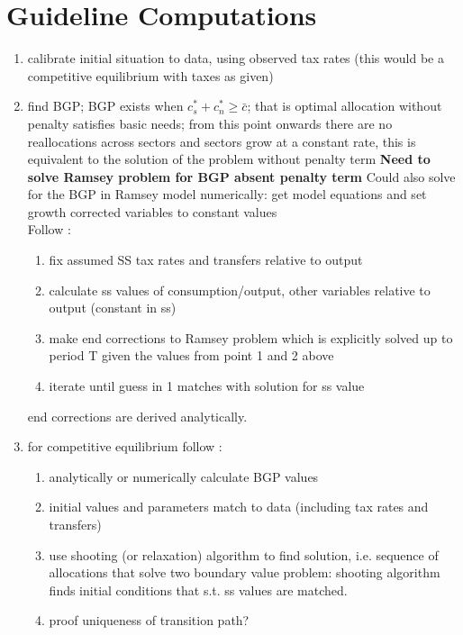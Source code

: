 \section{Guideline Computations}
\begin{enumerate}
	\item calibrate initial situation to data, using observed tax rates (this would be a competitive equilibrium with taxes as given)
	\item find BGP; BGP exists when $c^*_s+c_n^*\geq \bar{c}$; that is optimal allocation without penalty satisfies basic needs; from this point onwards there are no reallocations across sectors and sectors grow at a constant rate, this is equivalent to the solution of the problem without penalty term \ar \textbf{Need to solve Ramsey problem for BGP absent penalty term}
	Could also solve for the BGP in Ramsey model numerically: get model equations and set growth corrected variables to constant values\\
	Follow \cite{Jones1993OptimalGrowth}:
	\begin{enumerate}
		\item fix assumed SS tax rates and transfers relative to output
		\item calculate ss values of consumption/output, other variables relative to output (constant in ss)
		\item make end corrections to Ramsey problem which is explicitly solved up to period T given the values from point 1 and 2 above
		\item iterate until guess in 1 matches with solution for ss value 
	\end{enumerate}
end corrections are derived analytically.
	\item for competitive equilibrium follow \cite{Acemoglu2008CapitalGrowth}: 
	\begin{enumerate}
		\item analytically or numerically calculate BGP values
		\item initial values and parameters match to data (including tax rates and transfers)
		\item use shooting (or relaxation) algorithm to find solution, i.e. sequence of allocations that solve two boundary value problem: shooting algorithm finds initial conditions that s.t. ss values are matched. 
		\item proof uniqueness of transition path? 
	\end{enumerate}
	

\end{enumerate}
